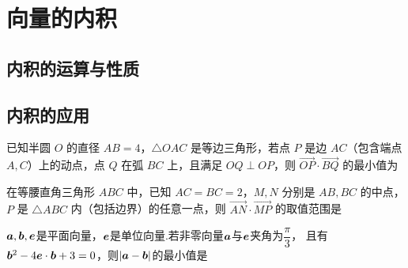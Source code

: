 \section{向量的内积}
\subsection{内积的运算与性质}
\clearpage
\subsection{内积的应用}

\begin{example}
    已知半圆 $O$ 的直径 $AB = 4$，$\triangle OAC$ 是等边三角形，若点 $P$ 是边 $AC$（包含端点 $A, C$）上的动点，点 $Q$ 在弧 $BC$ 上，且满足 $OQ \perp OP$，则 $\overrightarrow{OP} \cdot \overrightarrow{BQ}$ 的最小值为 
\end{example}

\begin{example}
    
在等腰直角三角形 $ABC$ 中，已知 $AC = BC = 2$，$M, N$ 分别是 $AB, BC$ 的中点，$P$ 是 $\triangle ABC$ 内（包括边界）的任意一点，则 $\overrightarrow{AN} \cdot \overrightarrow{MP}$ 的取值范围是
\end{example}



\begin{example}
    \(\boldsymbol{a},\boldsymbol{b},\boldsymbol{e}\)是平面向量，\(\boldsymbol{e}\)是单位向量.若非零向量\(\boldsymbol{a}\)与\(\boldsymbol{e}\)夹角为\(\dfrac{\pi}{3}\)，
    且有\(\boldsymbol{b}^2-4\boldsymbol{e}\cdot\boldsymbol{b} +3=0\)，则\(|\boldsymbol{a}-\boldsymbol{b}|\)的最小值是
\end{example}
















\clearpage
